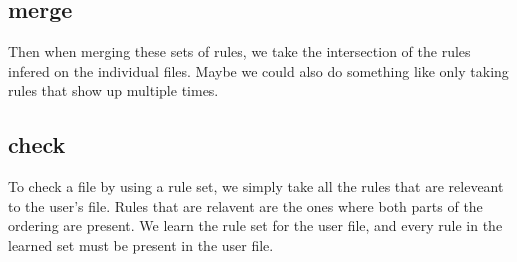 \subsection{merge}
  Then when merging these sets of rules, we take the intersection of the rules infered on the individual files.
  Maybe we could also do something like only taking rules that show up multiple times.
\subsection{check}
  To check a file by using a rule set, we simply take all the rules that are releveant to the user's file.
  Rules that are relavent are the ones where both parts of the ordering are present.
  We learn the rule set for the user file, and every rule in the learned set must be present in the user file.
